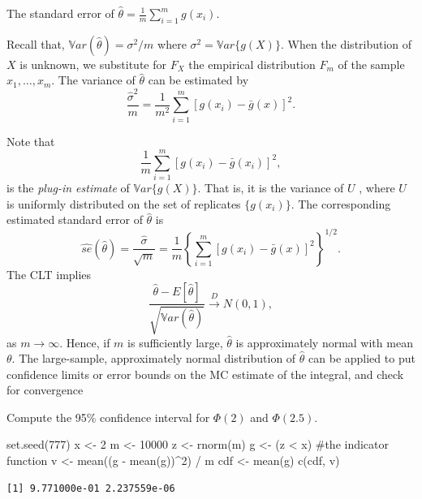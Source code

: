 \documentclass[
  letterpaper,
  DIV=11,
  numbers=noendperiod]{scrreprt}
\newenvironment{Shaded}{\begin{snugshade}}{\end{snugshade}}
\newcommand{\CommentTok}[1]{\textcolor[rgb]{0.37,0.37,0.37}{#1}}
\newcommand{\DecValTok}[1]{\textcolor[rgb]{0.68,0.00,0.00}{#1}}
\newcommand{\FunctionTok}[1]{\textcolor[rgb]{0.28,0.35,0.67}{#1}}
\newcommand{\NormalTok}[1]{\textcolor[rgb]{0.00,0.23,0.31}{#1}}
\newcommand{\OtherTok}[1]{\textcolor[rgb]{0.00,0.23,0.31}{#1}}
\newcommand{\SpecialCharTok}[1]{\textcolor[rgb]{0.37,0.37,0.37}{#1}}
\begin{document}
The standard error of \(\hat{\theta}= \frac{1}{m}\sum_{i=1}^m g(x_i)\).

Recall that, \(\mathbb{V}ar({\hat{\theta}})=\sigma^2/m\) where
\(\sigma^2 = \mathbb{V}ar\{g(X)\}\). When the distribution of \(X\) is
unknown, we substitute for \(F_X\) the empirical distribution \(F_m\) of
the sample \(x_1, \dots , x_m\). The variance of \(\hat{\theta}\) can be
estimated by \[
\frac{\hat{\sigma}^2}{m} = \frac{1}{m^2}\sum_{i=1}^m [g(x_i) - \bar{g}(x)]^2.
\]

Note that \[\frac{1}{m}\sum_{i=1}^m[g(x_i)-\bar{g}(x_i)]^2,\] is the
\emph{plug-in estimate} of \(\mathbb{V}ar\{g(X)\}\). That is, it is the
variance of \(U\) , where \(U\) is uniformly distributed on the set of
replicates \(\{g(x_i)\}\). The corresponding estimated standard error of
\(\hat{\theta}\) is \[
\widehat{se}(\hat{\theta}) = \frac{\hat{\sigma}}{\sqrt{m}} = \frac{1}{m}\left\{\sum_{i=1}^m [ g(x_i)- \bar{g}(x)]^2\right\}^{1/2}.
\] The CLT implies \[
\frac{\hat{\theta}-E[\hat{\theta}]}{\sqrt{\mathbb{V}ar(\hat{\theta})}} \overset{D}{\to} N(0,1),
\] as \(m\to\infty\). Hence, if \(m\) is sufficiently large,
\(\hat{\theta}\) is approximately normal with mean \(\theta\). The
large-sample, approximately normal distribution of \(\hat{\theta}\) can
be applied to put confidence limits or error bounds on the MC estimate
of the integral, and check for convergence

Compute the 95\% confidence interval for \(\Phi(2)\) and \(\Phi(2.5)\).

\begin{Shaded}
\begin{Highlighting}[]
\FunctionTok{set.seed}\NormalTok{(}\DecValTok{777}\NormalTok{)}
\NormalTok{x }\OtherTok{\textless{}{-}} \DecValTok{2}
\NormalTok{m }\OtherTok{\textless{}{-}} \DecValTok{10000}
\NormalTok{z }\OtherTok{\textless{}{-}} \FunctionTok{rnorm}\NormalTok{(m)}
\NormalTok{g }\OtherTok{\textless{}{-}}\NormalTok{ (z }\SpecialCharTok{\textless{}}\NormalTok{ x) }\CommentTok{\#the indicator function}
\NormalTok{v }\OtherTok{\textless{}{-}} \FunctionTok{mean}\NormalTok{((g }\SpecialCharTok{{-}} \FunctionTok{mean}\NormalTok{(g))}\SpecialCharTok{\^{}}\DecValTok{2}\NormalTok{) }\SpecialCharTok{/}\NormalTok{ m}
\NormalTok{cdf }\OtherTok{\textless{}{-}} \FunctionTok{mean}\NormalTok{(g)}
\FunctionTok{c}\NormalTok{(cdf, v)}
\end{Highlighting}
\end{Shaded}

\begin{verbatim}
[1] 9.771000e-01 2.237559e-06
\end{verbatim}
\end{document}
